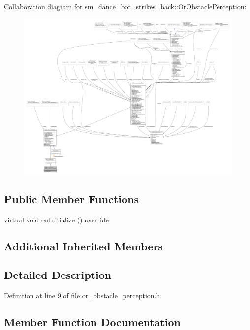 Collaboration diagram for sm\+\_\+dance\+\_\+bot\+\_\+strikes\+\_\+back\+:\+:Or\+Obstacle\+Perception\+:
\nopagebreak
\begin{figure}[H]
\begin{center}
\leavevmode
\includegraphics[width=350pt]{classsm__dance__bot__strikes__back_1_1OrObstaclePerception__coll__graph}
\end{center}
\end{figure}
\subsection*{Public Member Functions}
\begin{DoxyCompactItemize}
\item 
virtual void \hyperlink{classsm__dance__bot__strikes__back_1_1OrObstaclePerception_a11bcaa362ceecfbd5b26562e4b380c3c}{on\+Initialize} () override
\end{DoxyCompactItemize}
\subsection*{Additional Inherited Members}


\subsection{Detailed Description}


Definition at line 9 of file or\+\_\+obstacle\+\_\+perception.\+h.



\subsection{Member Function Documentation}
\mbox{\label{classsm__dance__bot__strikes__back_1_1OrObstaclePerception_a11bcaa362ceecfbd5b26562e4b380c3c}} 
